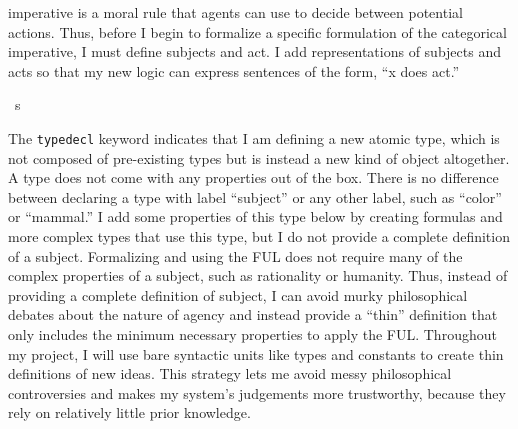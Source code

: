 \begin{isabellebody}
\begin{isamarkuptext}
imperative is a moral rule that agents can use to decide between potential actions. Thus, before I 
begin to formalize a specific formulation of the categorical imperative, I must define
subjects and act. I add representations of subjects and acts so that my new logic can express
sentences of the form, ``x does act.''%
\end{isamarkuptext}\isamarkuptrue%
\isamarkupfalse%
\ s\ %
%
\begin{isamarkuptext}%
The \texttt{typedecl} keyword indicates that I am defining a new atomic type, which is not composed
of pre-existing types but is instead a new kind of object altogether. A type does not come with any 
properties out of the box. There is no difference between declaring a type with label ``subject'' or any other
label, such as ``color'' or ``mammal.'' I add some properties of this type below by creating formulas
and more complex types that use this type, but I do not provide a complete definition of a subject.
Formalizing and using the FUL does not require many of the complex properties of a subject, such as 
rationality or humanity. Thus, instead of providing a complete definition of subject, I can avoid murky
philosophical debates about the nature of agency and instead provide a 
``thin'' definition that only includes the minimum necessary properties to apply the FUL. Throughout my 
project, I will use bare syntactic units like types and constants to create thin definitions of new ideas.
This strategy lets me avoid messy philosophical controversies and makes my system's judgements more 
trustworthy, because they rely on relatively little prior knowledge.


\end{isamarkuptext}
\end{isabellebody}

